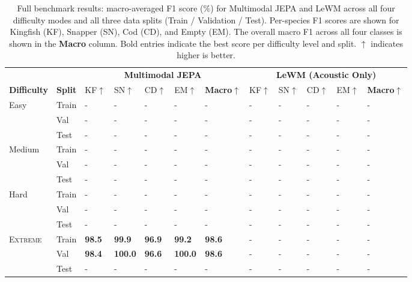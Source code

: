 \begin{table}[t]
\centering
\caption{%
  Full benchmark results: macro-averaged F1 score (\%) for Multimodal JEPA and LeWM across all four
  difficulty modes and all three data splits (Train / Validation / Test).
  Per-species F1 scores are shown for Kingfish (KF), Snapper (SN), Cod (CD), and Empty (EM).
  The overall macro F1 across all four classes is shown in the \textbf{Macro} column.
  Bold entries indicate the best score per difficulty level and split.
  $\uparrow$ indicates higher is better.
}
\label{tab:presence_results}
\setlength{\tabcolsep}{4.5pt}
\small
\begin{tabular}{@{}ll lllll lllll@{}}
\toprule
& & \multicolumn{5}{c}{\textbf{Multimodal JEPA}} 
  & \multicolumn{5}{c}{\textbf{LeWM (Acoustic Only)}} \\
\cmidrule(lr){3-7} \cmidrule(lr){8-12}
\textbf{Difficulty} & \textbf{Split} 
  & KF$\uparrow$ & SN$\uparrow$ & CD$\uparrow$ & EM$\uparrow$ & \textbf{Macro}$\uparrow$
  & KF$\uparrow$ & SN$\uparrow$ & CD$\uparrow$ & EM$\uparrow$ & \textbf{Macro}$\uparrow$ \\
\midrule
\multirow{3}{*}{Easy}
  & Train & - & - & - & - & - & - & - & - & - & - \\
  & Val & - & - & - & - & - & - & - & - & - & - \\
  & Test & - & - & - & - & - & - & - & - & - & - \\
\midrule
\multirow{3}{*}{Medium}
  & Train & - & - & - & - & - & - & - & - & - & - \\
  & Val & - & - & - & - & - & - & - & - & - & - \\
  & Test & - & - & - & - & - & - & - & - & - & - \\
\midrule
\multirow{3}{*}{Hard}
  & Train & - & - & - & - & - & - & - & - & - & - \\
  & Val & - & - & - & - & - & - & - & - & - & - \\
  & Test & - & - & - & - & - & - & - & - & - & - \\
\midrule
\multirow{3}{*}{\textsc{Extreme}}
  & Train & \textbf{98.5} & \textbf{99.9} & \textbf{96.9} & \textbf{99.2} & \textbf{98.6} & - & - & - & - & - \\
  & Val & \textbf{98.4} & \textbf{100.0} & \textbf{96.6} & \textbf{100.0} & \textbf{98.6} & - & - & - & - & - \\
  & Test & - & - & - & - & - & - & - & - & - & - \\


\end{tabular}
\end{table}
